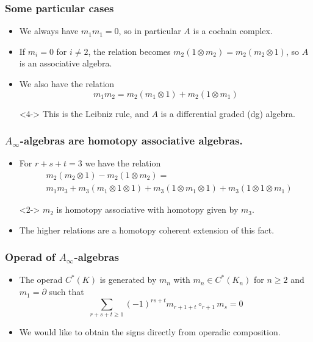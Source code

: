 \documentclass{beamer}
\theoremstyle{definition}
\begin{document}
\begin{frame}
\frametitle{Some particular cases}
\begin{itemize}
\item<1-> We always have $m_1m_1=0$, so in particular $A$ is a cochain complex.%
\item<2-> If $m_i=0$ for $i\neq 2$, the relation becomes $m_2(1\otimes m_2)=m_2(m_2\otimes 1)$, so $A$ is an associative algebra.
\item<3->  We also have the relation \[m_1m_2=m_2(m_1\otimes 1)+m_2(1\otimes m_1)\]%
\item[]<4-> This is the Leibniz rule, and $A$ is a differential graded (dg) algebra.
\end{itemize}
\end{frame}


\begin{frame}
\frametitle{$A_\infty$-algebras are homotopy associative algebras.}
\begin{itemize}
\item<1-> For $r+s+t=3$ we have the relation
\begin{align*}
&m_2(m_2\otimes 1)-m_2(1\otimes m_2)=\\ %
&m_1m_3+m_3(m_1\otimes 1\otimes 1)+m_3(1\otimes m_1\otimes 1)+m_3(1\otimes 1\otimes m_1)
\end{align*}
\item[]<2-> $m_2$ is homotopy associative with homotopy given by $m_3$. %
\item<3-> The higher relations are a homotopy coherent extension of this fact. %
\end{itemize}
\end{frame}

\begin{frame}
\frametitle{Operad of $A_\infty$-algebras}
\begin{itemize}
\item<1-> The operad $C^*(K)$ is generated by $m_n$ with $m_n\in C^*(K_n)$ for $n\geq 2$ and $m_1=\partial$ such that 
\[\sum_{r+s+t\geq 1}(-1)^{rs+t}m_{r+1+t}\circ_{r+1}m_s=0\]

\item<2-> We would like to obtain the signs directly from operadic composition.
\end{itemize}
\end{frame}
\end{document}
